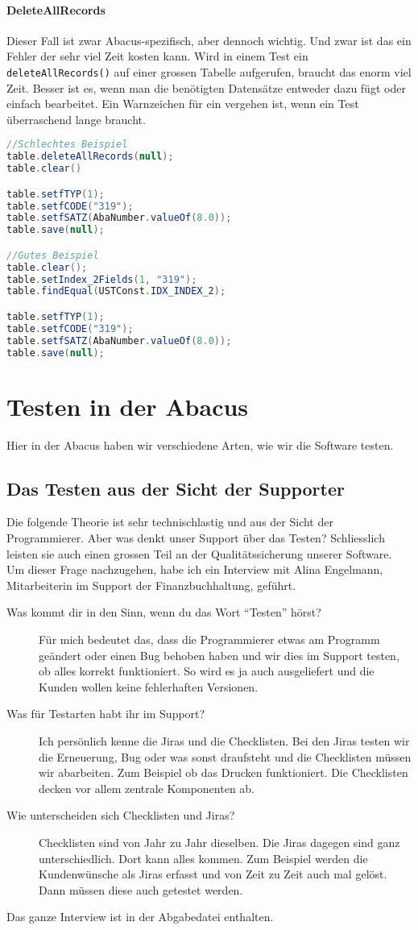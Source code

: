 \paragraph{DeleteAllRecords}
Dieser Fall ist zwar Abacus-spezifisch, aber dennoch wichtig. Und zwar ist das ein Fehler der sehr viel Zeit kosten kann. Wird in einem Test ein \texttt{deleteAllRecords()} auf einer grossen Tabelle aufgerufen, braucht das enorm viel Zeit. Besser ist es, wenn man die benötigten Datensätze entweder dazu fügt oder einfach bearbeitet. Ein Warnzeichen für ein vergehen ist, wenn ein Test überraschend lange braucht. 
\begin{lstlisting}[language=Java, caption={}]
//Schlechtes Beispiel
table.deleteAllRecords(null);
table.clear()

table.setfTYP(1);
table.setfCODE("319");
table.setfSATZ(AbaNumber.valueOf(8.0));
table.save(null);

//Gutes Beispiel
table.clear();
table.setIndex_2Fields(1, "319");
table.findEqual(USTConst.IDX_INDEX_2);

table.setfTYP(1);
table.setfCODE("319");
table.setfSATZ(AbaNumber.valueOf(8.0));
table.save(null);
\end{lstlisting}

\section{Testen in der Abacus} \label{Testen in der Abacus}
Hier in der Abacus haben wir verschiedene Arten, wie wir die Software testen.
\subsection{Das Testen aus der Sicht der Supporter}
Die folgende Theorie ist sehr technischlastig und aus der Sicht der Programmierer. Aber was denkt unser Support über das Testen? Schliesslich leisten sie auch einen grossen Teil an der Qualitätssicherung unserer Software. Um dieser Frage nachzugehen, habe ich ein Interview mit Alina Engelmann, Mitarbeiterin im Support der Finanzbuchhaltung, geführt.
\begin{description}
\item[Was kommt dir in den Sinn, wenn du das Wort \enquote{Testen} hörst?] Für mich bedeutet das, dass die Programmierer etwas am Programm geändert oder einen Bug behoben haben und wir dies im Support testen, ob alles korrekt funktioniert. So wird es ja auch ausgeliefert und die Kunden wollen keine fehlerhaften Versionen.
\item[Was für Testarten habt ihr im Support?] Ich persönlich kenne die Jiras und die Checklisten. Bei den Jiras testen wir die Erneuerung, Bug oder was sonst draufsteht und die Checklisten müssen wir abarbeiten. Zum Beispiel ob das Drucken funktioniert. Die Checklisten decken vor allem zentrale Komponenten ab.
\item[Wie unterscheiden sich Checklisten und Jiras?] Checklisten sind von Jahr zu Jahr dieselben. Die Jiras dagegen sind ganz unterschiedlich. Dort kann alles kommen. Zum Beispiel werden die Kundenwünsche als Jiras erfasst und von Zeit zu Zeit auch mal gelöst. Dann müssen diese auch getestet werden.
\end{description}
Das ganze Interview ist in der Abgabedatei enthalten.
